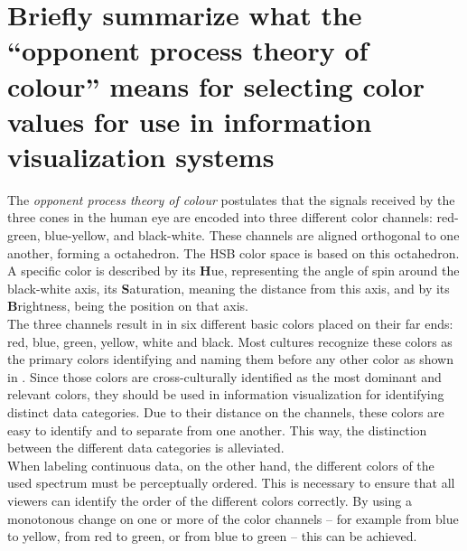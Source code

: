 \section{Briefly summarize what the ``opponent process theory of colour'' means for selecting color values for use in information visualization systems}

The \emph{opponent process theory of colour} postulates that the signals received by the three cones in the human eye are encoded into three different color channels: red-green, blue-yellow, and black-white. These channels are aligned orthogonal to one another, forming a octahedron. The HSB color space is based on this octahedron. A specific color is described by its \textbf{H}ue, representing the angle of spin around the black-white axis, its \textbf{S}aturation, meaning the distance from this axis, and by its \textbf{B}rightness, being the position on that axis. \\
The three channels result in in six different basic colors placed on their far ends: red, blue, green, yellow, white and black. Most cultures recognize these colors as the primary colors identifying and naming them before any other color as shown in \cite{color:Berlin}. Since those colors are cross-culturally identified as the most dominant and relevant colors, they should be used in information visualization for identifying distinct data categories. Due to their distance on the channels, these colors are easy to identify and to separate from one another. This way, the distinction between the different data categories is alleviated. \\
When labeling continuous data, on the other hand, the different colors of the used spectrum must be perceptually ordered. This is necessary to ensure that all viewers can identify the order of the different colors correctly. By using a monotonous change on one or more of the color channels -- for example from blue to yellow, from red to green, or from blue to green -- this can be achieved.